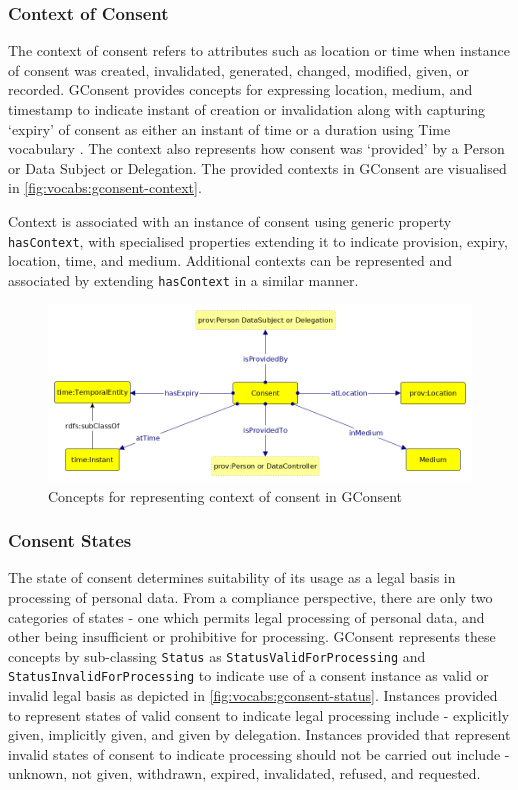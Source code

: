 \subsubsection{Context of Consent}
The context of consent refers to attributes such as location or time when instance of consent was created, invalidated, generated, changed, modified, given, or recorded.
GConsent provides concepts for expressing location, medium, and timestamp to indicate instant of creation or invalidation along with capturing `expiry' of consent as either an instant of time or a duration using Time vocabulary \cite{cox_time_2017}. The context also represents how consent was `provided' by a Person or Data Subject or Delegation. 
The provided contexts in GConsent are visualised in \autoref{fig:vocabs:gconsent-context}.

Context is associated with an instance of consent using generic property \texttt{hasContext}, with specialised properties extending it to indicate provision, expiry, location, time, and medium. 
Additional contexts can be represented and associated by extending \texttt{hasContext} in a similar manner.
\begin{figure}[htbp]
    \centering
    \includegraphics[width=0.8\linewidth]{img/gconsent_context.png}
    \caption{Concepts for representing context of consent in GConsent \cite{pandit_gconsent_2019}}
    \label{fig:vocabs:gconsent-context}
\end{figure}

\subsubsection{Consent States}
The state of consent determines suitability of its usage as a legal basis in  processing of personal data.
From a compliance perspective, there are only two categories of states - one which permits legal processing of personal data, and other being insufficient or prohibitive for processing.
GConsent represents these concepts by sub-classing \texttt{Status} as \texttt{StatusValidForProcessing} and \texttt{StatusInvalidForProcessing} to indicate use of a consent instance as valid or invalid legal basis as depicted in \autoref{fig:vocabs:gconsent-status}.
Instances provided to represent states of valid consent to indicate legal processing include - explicitly given, implicitly given, and given by delegation.
Instances provided that represent invalid states of consent to indicate processing should not be carried out include - unknown, not given, withdrawn, expired, invalidated, refused, and requested.

